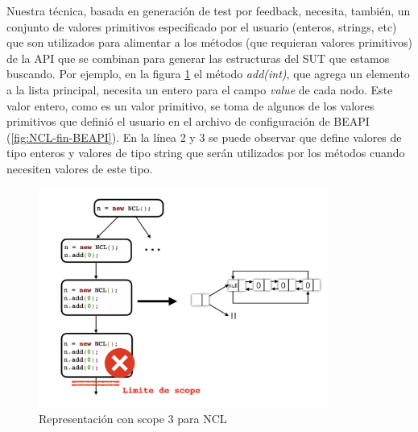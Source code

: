 Nuestra técnica, basada en generación de test por feedback, necesita, también, un conjunto de valores primitivos especificado por el usuario 
(enteros, strings, etc) que son utilizados para alimentar a los métodos (que requieran valores primitivos) de la API que se combinan para generar 
las estructuras del SUT que estamos buscando.
Por ejemplo, en la figura \ref{fig:scope} el método \emph{add(int)}, que agrega un elemento a la lista principal, 
necesita un entero para el campo \emph{value} de cada nodo. Este valor entero, como es un valor primitivo, 
se toma de algunos de los valores primitivos que definió el usuario en el archivo de configuración de BEAPI (\ref{fig:NCL-fin-BEAPI}). 
En la línea 2 y 3 se puede observar que define valores de tipo enteros y valores de tipo string que serán utilizados por los métodos 
cuando necesiten valores de este tipo. 
\\


\begin{figure}[H]
    \centering
    \includegraphics[width=0.85\textwidth]{images/scope.jpg}
    \caption{Representación con scope 3 para NCL}
    \label{fig:scope}
\end{figure}


